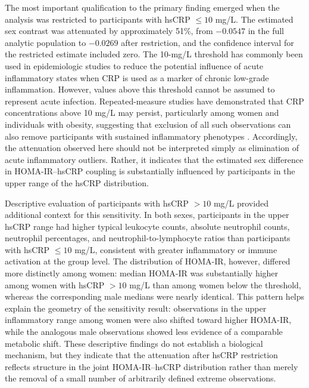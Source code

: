 \documentclass[11pt]{article}
\begin{document}
The most important qualification to the primary finding emerged when the
analysis was restricted to participants with hsCRP $\leq10$ mg/L. The
estimated sex contrast was attenuated by approximately 51\%, from $-0.0547$
in the full analytic population to $-0.0269$ after restriction, and the
confidence interval for the restricted estimate included zero. The
10-mg/L threshold has commonly been used in epidemiologic studies to reduce
the potential influence of acute inflammatory states when CRP is used as a
marker of chronic low-grade inflammation. However, values above this
threshold cannot be assumed to represent acute infection. Repeated-measure
studies have demonstrated that CRP concentrations above 10 mg/L may persist,
particularly among women and individuals with obesity, suggesting that
exclusion of all such observations can also remove participants with
sustained inflammatory phenotypes \citep{Ishii2012CRP}. Accordingly, the
attenuation observed here should not be interpreted simply as elimination
of acute inflammatory outliers. Rather, it indicates that the estimated sex
difference in HOMA-IR--hsCRP coupling is substantially influenced by
participants in the upper range of the hsCRP distribution.

Descriptive evaluation of participants with hsCRP $>10$ mg/L provided
additional context for this sensitivity. In both sexes, participants in the
upper hsCRP range had higher typical leukocyte counts, absolute neutrophil
counts, neutrophil percentages, and neutrophil-to-lymphocyte ratios than
participants with hsCRP $\leq10$ mg/L, consistent with greater inflammatory
or immune activation at the group level. The distribution of HOMA-IR,
however, differed more distinctly among women: median HOMA-IR was
substantially higher among women with hsCRP $>10$ mg/L than among women
below the threshold, whereas the corresponding male medians were nearly
identical. This pattern helps explain the geometry of the sensitivity
result: observations in the upper inflammatory range among women were also
shifted toward higher HOMA-IR, while the analogous male observations showed
less evidence of a comparable metabolic shift. These descriptive findings
do not establish a biological mechanism, but they indicate that the
attenuation after hsCRP restriction reflects structure in the joint
HOMA-IR--hsCRP distribution rather than merely the removal of a small number
of arbitrarily defined extreme observations.
\end{document}

